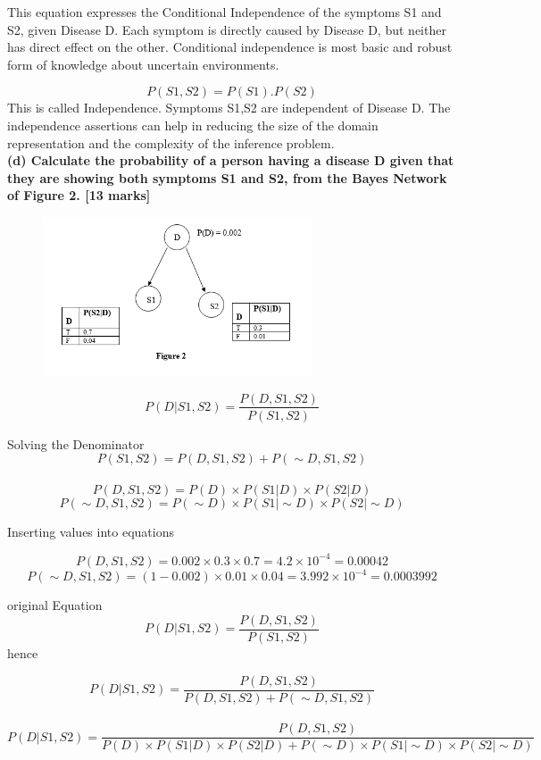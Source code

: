 \documentclass[12pt,a4paper]{article}
\begin{document}
{	This equation expresses the Conditional Independence of the symptoms S1 and S2, given Disease D. Each symptom is directly caused by
	Disease D, but neither has direct effect on the other. Conditional independence is most basic and robust form of knowledge about uncertain environments.
	
	


	
	\begin{equation*}
	P(S1,S2)=P(S1).P(S2)
	\end{equation*}
	This is called Independence. Symptoms S1,S2 are independent of Disease D. The independence assertions can help in reducing
	the size of the domain representation and the complexity of the inference problem.
	\\
	
	
	\textbf{(d)	Calculate the probability of a person having a disease D given that they are showing both symptoms S1 and S2, from the Bayes Network of Figure 2.
	[13 marks]}
\begin{figure}[h]
\includegraphics[width=80mm]{q6.png}
\end{figure}

\[P(D|S1, S2)=\frac{P(D, S1, S2)} {P(S1, S2)}\]

Solving the Denominator 
\[P(S1, S2) =P(D, S1, S2) + P(\sim D, S1, S2)\]\\


\[ P(D,S1,S2)=P(D) \times P(S1|D) \times P(S2|D)\]
\[P(\sim D, S1, S2)=P(\sim D) \times P(S1|\sim D) \times P(S2|\sim D)\]

Inserting values into equations

\[ P(D,S1,S2)=0.002 \times 0.3 \times 0.7= 4.2 \times 10^{-4} = 0.00042\]
\[P(\sim D, S1, S2) = (1-0.002) \times 0.01 \times 0.04 = 3.992 \times 10^{-4}= 0.0003992 \]
	
		 original Equation
		\[P(D|S1, S2)=\frac{P(D, S1, S2)}{P(S1, S2)}\]
		hence 
		
	\[P(D|S1, S2)=\frac{P(D, S1, S2)}{P(D,S1,S2)+P(\sim D,S1,S2)}\] \\
		\[P(D|S1, S2)=\frac{P(D, S1, S2)}{P(D) \times P(S1|D) \times P(S2|D)+P(\sim D) \times P(S1|\sim D) \times P(S2|\sim D)}\]\\

}
\end{document}
